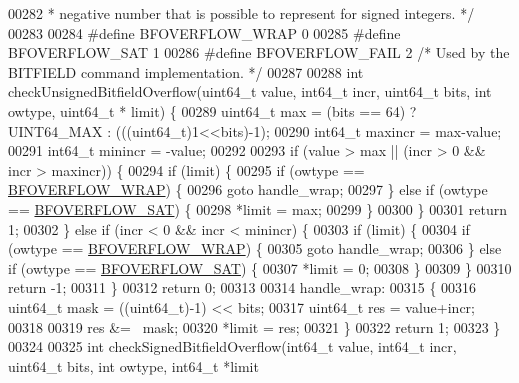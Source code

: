 \begin{DoxyCode}
00282 \textcolor{comment}{ * negative number that is possible to represent for signed integers. */}
00283 
00284 \textcolor{preprocessor}{#}\textcolor{preprocessor}{define} \textcolor{preprocessor}{BFOVERFLOW\_WRAP} 0
00285 \textcolor{preprocessor}{#}\textcolor{preprocessor}{define} \textcolor{preprocessor}{BFOVERFLOW\_SAT} 1
00286 \textcolor{preprocessor}{#}\textcolor{preprocessor}{define} \textcolor{preprocessor}{BFOVERFLOW\_FAIL} 2 \textcolor{comment}{/* Used by the BITFIELD command implementation. */}
00287 
00288 \textcolor{keywordtype}{int} checkUnsignedBitfieldOverflow(uint64\_t value, int64\_t incr, uint64\_t bits, \textcolor{keywordtype}{int} owtype, uint64\_t *
      limit) \{
00289     uint64\_t max = (bits == 64) ? UINT64\_MAX : (((uint64\_t)1<<bits)-1);
00290     int64\_t maxincr = max-value;
00291     int64\_t minincr = -value;
00292 
00293     \textcolor{keywordflow}{if} (value > max || (incr > 0 && incr > maxincr)) \{
00294         \textcolor{keywordflow}{if} (limit) \{
00295             \textcolor{keywordflow}{if} (owtype == \hyperlink{bitops_8c_a4ecdfa50fecb0c7c8f11f098d9b808e8}{BFOVERFLOW\_WRAP}) \{
00296                 \textcolor{keywordflow}{goto} handle\_wrap;
00297             \} \textcolor{keywordflow}{else} \textcolor{keywordflow}{if} (owtype == \hyperlink{bitops_8c_abe656810f7c24542b4451c96b960cae1}{BFOVERFLOW\_SAT}) \{
00298                 *limit = max;
00299             \}
00300         \}
00301         \textcolor{keywordflow}{return} 1;
00302     \} \textcolor{keywordflow}{else} \textcolor{keywordflow}{if} (incr < 0 && incr < minincr) \{
00303         \textcolor{keywordflow}{if} (limit) \{
00304             \textcolor{keywordflow}{if} (owtype == \hyperlink{bitops_8c_a4ecdfa50fecb0c7c8f11f098d9b808e8}{BFOVERFLOW\_WRAP}) \{
00305                 \textcolor{keywordflow}{goto} handle\_wrap;
00306             \} \textcolor{keywordflow}{else} \textcolor{keywordflow}{if} (owtype == \hyperlink{bitops_8c_abe656810f7c24542b4451c96b960cae1}{BFOVERFLOW\_SAT}) \{
00307                 *limit = 0;
00308             \}
00309         \}
00310         \textcolor{keywordflow}{return} -1;
00311     \}
00312     \textcolor{keywordflow}{return} 0;
00313 
00314 handle\_wrap:
00315     \{
00316         uint64\_t mask = ((uint64\_t)-1) << bits;
00317         uint64\_t res = value+incr;
00318 
00319         res &= ~mask;
00320         *limit = res;
00321     \}
00322     \textcolor{keywordflow}{return} 1;
00323 \}
00324 
00325 \textcolor{keywordtype}{int} checkSignedBitfieldOverflow(int64\_t value, int64\_t incr, uint64\_t bits, \textcolor{keywordtype}{int} owtype, int64\_t *limit

\end{DoxyCode}
